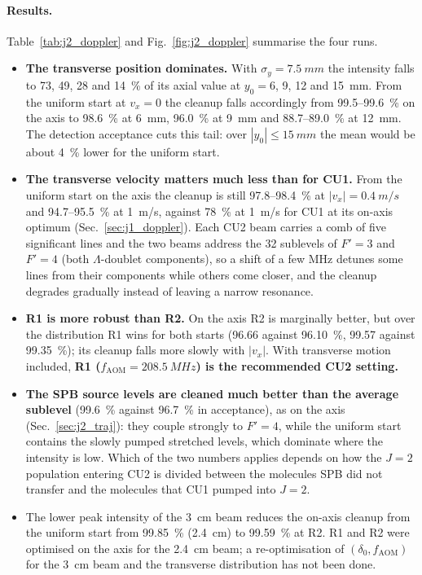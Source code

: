\documentclass[11pt,a4paper,oneside]{report}
\newcommand{\sigy}{\sigma_{y}}
\newcommand{\fAOM}{f_{\mathrm{AOM}}}
\begin{document}
\paragraph{Results.} Table~\ref{tab:j2_doppler} and Fig.~\ref{fig:j2_doppler} summarise the
four runs.
\begin{itemize}
  \item \textbf{The transverse position dominates.} With $\sigy=\SI{7.5}{mm}$ the intensity
        falls to 73, 49, 28 and \SI{14}{\percent} of its axial value at $y_0=6$, 9, 12 and
        \SI{15}{mm}. From the uniform start at $v_x=0$ the cleanup falls accordingly from
        \SI{99.5}{}--\SI{99.6}{\percent} on the axis to \SI{98.6}{\percent} at \SI{6}{mm},
        \SI{96.0}{\percent} at \SI{9}{mm} and \SI{88.7}{}--\SI{89.0}{\percent} at \SI{12}{mm}.
        The detection acceptance cuts this tail: over $|y_0|\leq\SI{15}{mm}$ the mean would be
        about \SI{4}{\percent} lower for the uniform start.
  \item \textbf{The transverse velocity matters much less than for CU1.} From the uniform start
        on the axis the cleanup is still \SI{97.8}{}--\SI{98.4}{\percent} at $|v_x|=\SI{0.4}{m/s}$
        and \SI{94.7}{}--\SI{95.5}{\percent} at \SI{1}{m/s}, against \SI{78}{\percent} at
        \SI{1}{m/s} for CU1 at its on-axis optimum (Sec.~\ref{sec:j1_doppler}). Each CU2 beam carries
        a comb of five significant lines and the two beams address the 32 sublevels of $F'=3$ and
        $F'=4$ (both $\Lambda$-doublet components), so a
        shift of a few MHz detunes some lines from their components while others come closer,
        and the cleanup degrades gradually instead of leaving a narrow resonance.
  \item \textbf{R1 is more robust than R2.} On the axis R2 is marginally better, but over the
        distribution R1 wins for both starts (96.66 against \SI{96.10}{\percent}, 99.57 against
        \SI{99.35}{\percent}); its cleanup falls more slowly with $|v_x|$. With transverse motion
        included, \textbf{R1 ($\fAOM=\SI{208.5}{MHz}$) is the recommended CU2 setting.}
  \item \textbf{The SPB source levels are cleaned much better than the average sublevel}
        (\SI{99.6}{\percent} against \SI{96.7}{\percent} in acceptance), as on the axis
        (Sec.~\ref{sec:j2_traj}): they couple strongly to $F'=4$, while the uniform start
        contains the slowly pumped stretched levels, which dominate where the intensity is low.
        Which of the two numbers applies depends on how the $J=2$ population entering CU2 is
        divided between the molecules SPB did not transfer and the molecules that CU1 pumped
        into $J=2$.
  \item The lower peak intensity of the \SI{3}{cm} beam reduces the on-axis cleanup from the
        uniform start from \SI{99.85}{\percent} (\SI{2.4}{cm}) to \SI{99.59}{\percent} at R2. R1 and R2
        were optimised on the axis for the \SI{2.4}{cm} beam; a re-optimisation of
        $(\delta_0,\fAOM)$ for the \SI{3}{cm} beam and the transverse distribution has not been
        done.
\end{itemize}
\end{document}
